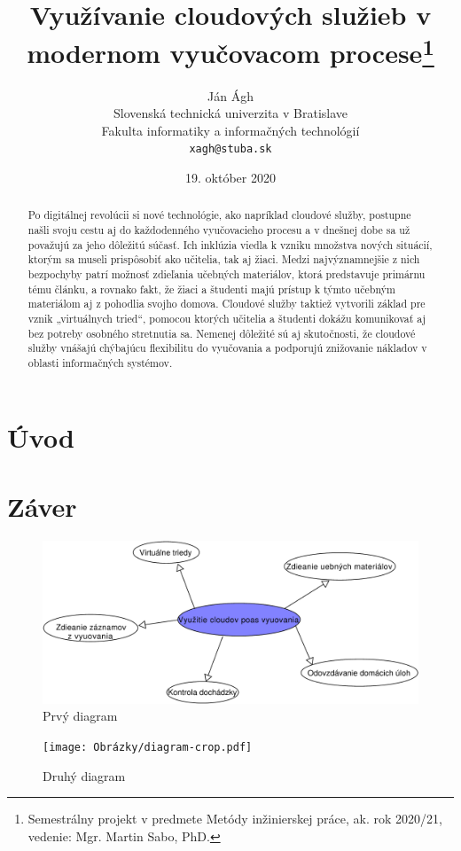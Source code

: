 \documentclass[10pt,twoside,slovak,a4paper]{article}
\title{Využívanie cloudových služieb v 
modernom vyučovacom procese\thanks{Semestrálny projekt v predmete Metódy inžinierskej práce, ak. rok 2020/21, vedenie: Mgr. Martin Sabo, PhD.}} %
\author{Ján Ágh\\[2pt]
	{\small Slovenská technická univerzita v Bratislave}\\
	{\small Fakulta informatiky a informačných technológií}\\
	{\small \texttt{xagh@stuba.sk}}
	}
\date{\small 19. október 2020} %
\begin{document}
\maketitle

\begin{abstract}

Po digitálnej revolúcii si nové technológie, ako napríklad cloudové služby, postupne
našli svoju cestu aj do každodenného vyučovacieho procesu a v dnešnej dobe sa už považujú
za jeho dôležitú súčasť. Ich inklúzia viedla k vzniku množstva nových situácií, ktorým sa
museli prispôsobiť ako učitelia, tak aj žiaci. Medzi najvýznamnejšie z nich bezpochyby patrí
možnosť zdieľania učebných materiálov, ktorá predstavuje primárnu tému článku, a rovnako
fakt, že žiaci a študenti majú prístup k týmto učebným materiálom aj z pohodlia svojho
domova. Cloudové služby taktiež vytvorili základ pre vznik „virtuálnych tried“, pomocou
ktorých učitelia a študenti dokážu komunikovať aj bez potreby osobného stretnutia sa.
Nemenej dôležité sú aj skutočnosti, že cloudové služby vnášajú chýbajúcu flexibilitu do
vyučovania a podporujú znižovanie nákladov v oblasti informačných systémov.

\end{abstract}



\section{Úvod}




\section{Záver}

\begin{figure}
\includegraphics[width=1\textwidth]{Obrázky/opis-crop.pdf}
\caption{Prvý diagram}
\end{figure}


\begin{figure}
\centering
\texttt{[image: Obrázky/diagram-crop.pdf]}
\caption{Druhý diagram}
\end{figure}



\end{document}
